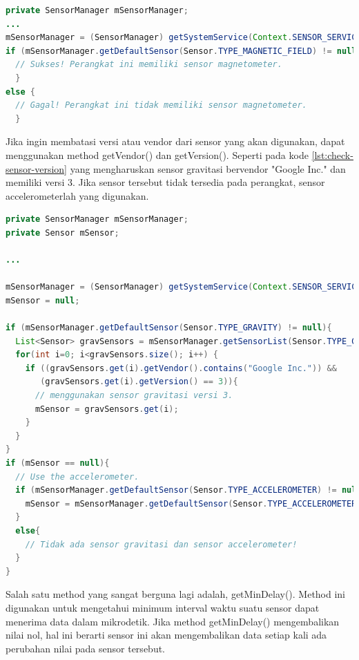 \begin{lstlisting}[caption={Contoh untuk mengecek apakah perangkat yang digunakan memiliki sensor dengan jenis yang diberikan},label={lst:check-sensor},language=java]
private SensorManager mSensorManager;
...
mSensorManager = (SensorManager) getSystemService(Context.SENSOR_SERVICE);
if (mSensorManager.getDefaultSensor(Sensor.TYPE_MAGNETIC_FIELD) != null){
  // Sukses! Perangkat ini memiliki sensor magnetometer.
  }
else {
  // Gagal! Perangkat ini tidak memiliki sensor magnetometer.
  }
\end{lstlisting}

Jika ingin membatasi versi atau vendor dari sensor yang akan digunakan, dapat menggunakan method getVendor() dan getVersion(). Seperti pada kode \ref{lst:check-sensor-version} yang mengharuskan sensor gravitasi bervendor "Google Inc." dan memiliki versi 3. Jika sensor tersebut tidak tersedia pada perangkat, sensor accelerometerlah yang digunakan.

\begin{lstlisting}[caption={Contoh untuk mengecek apakah perangkat yang digunakan memiliki sensor dengan jenis yang diberikan},label={lst:check-sensor-version},language=java]
private SensorManager mSensorManager;
private Sensor mSensor;

...

mSensorManager = (SensorManager) getSystemService(Context.SENSOR_SERVICE);
mSensor = null;

if (mSensorManager.getDefaultSensor(Sensor.TYPE_GRAVITY) != null){
  List<Sensor> gravSensors = mSensorManager.getSensorList(Sensor.TYPE_GRAVITY);
  for(int i=0; i<gravSensors.size(); i++) {
    if ((gravSensors.get(i).getVendor().contains("Google Inc.")) &&
       (gravSensors.get(i).getVersion() == 3)){
      // menggunakan sensor gravitasi versi 3.
      mSensor = gravSensors.get(i);
    }
  }
}
if (mSensor == null){
  // Use the accelerometer.
  if (mSensorManager.getDefaultSensor(Sensor.TYPE_ACCELEROMETER) != null){
    mSensor = mSensorManager.getDefaultSensor(Sensor.TYPE_ACCELEROMETER);
  }
  else{
    // Tidak ada sensor gravitasi dan sensor accelerometer!
  }
}
\end{lstlisting}

Salah satu method yang sangat berguna lagi adalah, getMinDelay(). Method ini digunakan untuk mengetahui minimum interval waktu suatu sensor dapat menerima data dalam mikrodetik. Jika method getMinDelay() mengembalikan nilai nol, hal ini berarti sensor ini akan mengembalikan data setiap kali ada perubahan nilai pada sensor tersebut. 


